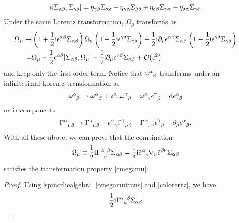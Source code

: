 \documentclass[10pt]{article}
\begin{document}
\begin{align}
    i\comm{\Sigma_{\alpha\beta}}{\Sigma_{\gamma\delta}}=\eta_{\gamma\beta}\Sigma_{\alpha\delta}-\eta_{\gamma\alpha}\Sigma_{\beta\delta}+\eta_{\delta\beta}\Sigma_{\gamma\alpha}-\eta_{\delta\alpha}\Sigma_{\gamma\delta}.\label{spinorliealgebra}
\end{align}
Under the same Lorentz transformation, $\Omega_\mu$ transforms as
\begin{align}
    \Omega_\mu\to & \left(1+\frac{1}{2}\ii\epsilon^{\alpha\beta}\Sigma_{\alpha\beta}\right)\Omega_\mu\left(1-\frac{1}{2}\ii\epsilon^{\gamma\delta}\Sigma_{\gamma\delta}\right)-\frac{1}{2}\ii\partial_\mu \epsilon^{\alpha\beta}\Sigma_{\alpha\beta}\left(1-\frac{1}{2}\ii\epsilon^{\gamma\delta}\Sigma_{\gamma\delta}\right)\notag \\
    =             & \Omega_\mu+\frac{1}{2}\epsilon^{\alpha\beta}\comm{\Sigma_{\alpha\beta}}{\Omega_\mu}-\frac{1}{2}\ii\partial_\mu\epsilon^{\alpha\beta}\Sigma_{\alpha\beta}+\order{\epsilon^2}\label{omegamutrans}
\end{align}
and keep only the first order term.
Notice that $\tensor{\omega}{^\alpha_\beta}$ transforms under an infinitesimal Lorentz transformation as
\begin{align}
    \tensor{\omega}{^\alpha_\beta}\to\tensor{\omega}{^\alpha_\beta}+\tensor{\epsilon}{^\alpha_\gamma}\tensor{\omega}{^\gamma_\beta}-\tensor{\omega}{^\alpha_\gamma}\tensor{\epsilon}{^\gamma_\beta}-\dd{\tensor{\epsilon}{^\alpha_\beta}}
\end{align}
or in components
\begin{align}
    \tensor{\Gamma}{^\alpha_\mu_\beta}\to\tensor{\Gamma}{^\alpha_\mu_\beta}+\tensor{\epsilon}{^\alpha_\gamma}\tensor{\Gamma}{^\gamma_\mu_\beta}-\tensor{\Gamma}{^\alpha_\mu_\gamma}\tensor{\epsilon}{^\gamma_\beta}-\partial_\mu\tensor{\epsilon}{^\alpha_\beta}.
\end{align}
With all these above, we can prove that the combination
\begin{align}
    \Omega_\mu\equiv\frac{1}{2}\ii\tensor{\Gamma}{^\alpha_\mu^\beta}\Sigma_{\alpha\beta}=\frac{1}{2}\ii\tensor{\tilde{e}}{^\alpha_\nu}\nabla_\nu \tilde{e}^{\beta\nu}\Sigma_{\alpha\beta}\label{cnlorentz}
\end{align}
satisfies the transformation property \eqref{omegamu}:
\begin{proof}
    Using \eqref{spinorliealgebra} \eqref{omegamutrans} and \eqref{cnlorentz}, we have
    \begin{align}
        \frac{1}{2}\ii\tensor{\Gamma}{^\alpha_\mu^\beta}\Sigma_{\alpha\beta}
    \end{align}
\end{proof}
\end{document}
